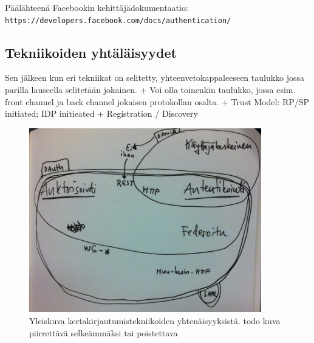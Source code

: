 \documentclass[finnish,gradu]{tktltiki}
\begin{document}
  Päälähteenä Facebookin kehittäjädokumentaatio:
  \\ \verb!https://developers.facebook.com/docs/authentication/!




  \subsection{Tekniikoiden yhtäläisyydet} %
  \label{sub:tekniikoiden_yhtäläisyydet}

  Sen jälkeen kun eri tekniikat on selitetty, yhteenvetokappaleeseen taulukko jossa parilla lauseella selitetään jokainen.
  + Voi olla toinenkin taulukko, jossa esim. front channel ja back channel jokaisen protokollan osalta.
  + Trust Model: RP/SP initiated; IDP initieated %
  + Registration / Discovery %

    \begin{figure}
      \centering
      \includegraphics[width=0.9\textwidth]{images/kertakirkautumistekniikat_venn.jpg}
      \caption{Yleiskuva kertakirjautumistekniikoiden yhtenäisyyksistä. todo kuva piirrettävä selkeämmäksi tai poistettava}
      \label{fig:yleiskuva_sso_yhtenaisyyksista}
    \end{figure}
\end{document}
